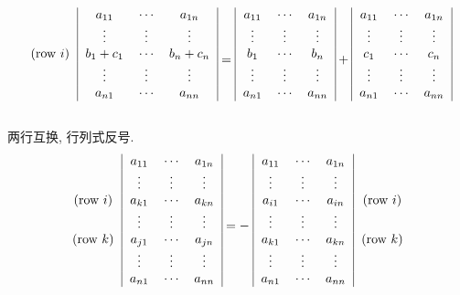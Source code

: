 \begin{Property}
$$
\begin{blockarray}{c|ccc|}
&a_{11} & \cdots & a_{1n} \\
&\vdots & \vdots & \vdots \\
\text{(row $i$)} &b_{1} + c_1 & \cdots & b_{n} +c_{n} \\
&\vdots & \vdots & \vdots \\
&a_{n1} & \cdots & a_{nn} \\
\end{blockarray}
= 
\begin{blockarray}{|ccc|}
a_{11} & \cdots & a_{1n} \\
\vdots & \vdots & \vdots \\
b_{1} & \cdots & b_{n} \\
\vdots & \vdots & \vdots \\
a_{n1} & \cdots & a_{nn} \\
\end{blockarray}
+
\begin{blockarray}{|ccc|}
a_{11} & \cdots & a_{1n} \\
\vdots & \vdots & \vdots \\
c_{1} & \cdots & c_{n} \\
\vdots & \vdots & \vdots \\
a_{n1} & \cdots & a_{nn} \\
\end{blockarray}
$$
\end{Property}

\begin{Property}
两行互换, 行列式反号.
$$
\begin{blockarray}{c|ccc|}
&a_{11} & \cdots & a_{1n} \\
&\vdots & \vdots & \vdots \\
\text{(row $i$)} &a_{k1} & \cdots & a_{kn} \\
&\vdots & \vdots & \vdots \\
\text{(row $k$)} &a_{j1} & \cdots & a_{jn} \\
&\vdots & \vdots & \vdots \\
&a_{n1} & \cdots & a_{nn} \\
\end{blockarray}
= 
-\;
\begin{blockarray}{|ccc|c}
a_{11} & \cdots & a_{1n} &\\
\vdots & \vdots & \vdots &\\
a_{i1} & \cdots & a_{in} & \text{(row $i$)}\\
\vdots & \vdots & \vdots &\\
a_{k1} & \cdots & a_{kn} & \text{(row $k$)}\\
\vdots & \vdots & \vdots &\\
a_{n1} & \cdots & a_{nn} &\\
\end{blockarray}
$$
\end{Property}

